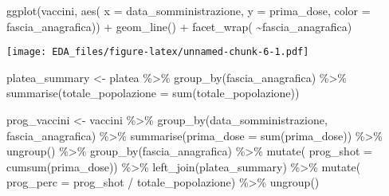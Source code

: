 \documentclass[
]{article}
\newenvironment{Shaded}{\begin{snugshade}}{\end{snugshade}}
\newcommand{\AttributeTok}[1]{\textcolor[rgb]{0.77,0.63,0.00}{#1}}
\newcommand{\FunctionTok}[1]{\textcolor[rgb]{0.00,0.00,0.00}{#1}}
\newcommand{\NormalTok}[1]{#1}
\newcommand{\OtherTok}[1]{\textcolor[rgb]{0.56,0.35,0.01}{#1}}
\newcommand{\SpecialCharTok}[1]{\textcolor[rgb]{0.00,0.00,0.00}{#1}}
\begin{document}
\begin{Shaded}
\begin{Highlighting}[]
\FunctionTok{ggplot}\NormalTok{(vaccini, }
       \FunctionTok{aes}\NormalTok{( }\AttributeTok{x =}\NormalTok{ data\_somministrazione,}
            \AttributeTok{y =}\NormalTok{ prima\_dose,}
            \AttributeTok{color =}\NormalTok{ fascia\_anagrafica)) }\SpecialCharTok{+}
  \FunctionTok{geom\_line}\NormalTok{() }\SpecialCharTok{+}
  \FunctionTok{facet\_wrap}\NormalTok{( }\SpecialCharTok{\textasciitilde{}}\NormalTok{fascia\_anagrafica)}
\end{Highlighting}
\end{Shaded}

\texttt{[image: EDA\_files/figure-latex/unnamed-chunk-6-1.pdf]}

\begin{Shaded}
\begin{Highlighting}[]
\NormalTok{platea\_summary }\OtherTok{\textless{}{-}}\NormalTok{ platea }\SpecialCharTok{\%\textgreater{}\%} 
  \FunctionTok{group\_by}\NormalTok{(fascia\_anagrafica) }\SpecialCharTok{\%\textgreater{}\%} 
  \FunctionTok{summarise}\NormalTok{(}\AttributeTok{totale\_popolazione =} \FunctionTok{sum}\NormalTok{(totale\_popolazione))}

\NormalTok{prog\_vaccini }\OtherTok{\textless{}{-}}\NormalTok{ vaccini }\SpecialCharTok{\%\textgreater{}\%}
  \FunctionTok{group\_by}\NormalTok{(data\_somministrazione, fascia\_anagrafica) }\SpecialCharTok{\%\textgreater{}\%} 
  \FunctionTok{summarise}\NormalTok{(}\AttributeTok{prima\_dose =} \FunctionTok{sum}\NormalTok{(prima\_dose)) }\SpecialCharTok{\%\textgreater{}\%} 
  \FunctionTok{ungroup}\NormalTok{() }\SpecialCharTok{\%\textgreater{}\%} 
  \FunctionTok{group\_by}\NormalTok{(fascia\_anagrafica) }\SpecialCharTok{\%\textgreater{}\%} 
  \FunctionTok{mutate}\NormalTok{( }\AttributeTok{prog\_shot =} \FunctionTok{cumsum}\NormalTok{(prima\_dose)) }\SpecialCharTok{\%\textgreater{}\%} 
  \FunctionTok{left\_join}\NormalTok{(platea\_summary) }\SpecialCharTok{\%\textgreater{}\%} 
  \FunctionTok{mutate}\NormalTok{( }\AttributeTok{prog\_perc =}\NormalTok{ prog\_shot }\SpecialCharTok{/}\NormalTok{ totale\_popolazione) }\SpecialCharTok{\%\textgreater{}\%} 
  \FunctionTok{ungroup}\NormalTok{()}
\end{Highlighting}
\end{Shaded}
\end{document}
